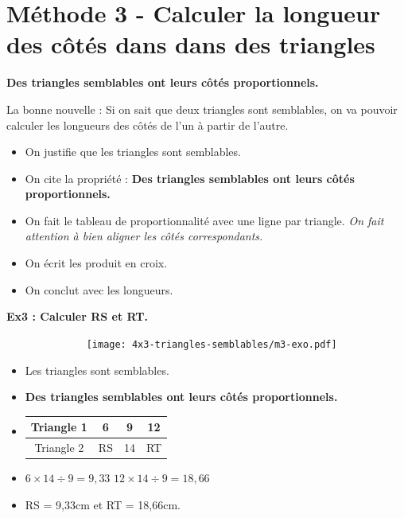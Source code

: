\newpage
\section*{Méthode 3 - Calculer la longueur des côtés dans dans des triangles}

\textbf{Des triangles semblables ont leurs côtés proportionnels.}

La bonne nouvelle : Si on sait que deux triangles sont semblables, on va pouvoir calculer les longueurs des côtés de l'un à partir de l'autre. 

\begin{itemize}
  \item On justifie que les triangles sont semblables.
  \item On cite la propriété : \textbf{Des triangles semblables ont leurs côtés proportionnels.} 
  \item On fait le tableau de proportionnalité avec une ligne par triangle. \textit{On fait attention à bien aligner les côtés correspondants.}
  \item On écrit les produit en croix. 
  \item On conclut avec les longueurs. 
\end{itemize}

\horrule{1px}
\textbf{Ex3 : Calculer RS et RT.}

\begin{multicols}{2}
\begin{figure}[H]
      \centering
      \texttt{[image: 4x3-triangles-semblables/m3-exo.pdf]}
\end{figure}
\columnbreak

\begin{itemize}
  \item Les triangles sont semblables.
  \item \textbf{Des triangles semblables ont leurs côtés proportionnels.} 
  \item     
  \begin{tabular}{|c|c|c|c|}
    \hline
    Triangle 1 & 6 & 9 & 12 \\  \hline
    Triangle 2 & RS & 14 & RT\\  \hline
  \end{tabular}
  \item $6  \times 14 \div 9 = 9,33$ \newline
        $12 \times 14 \div 9 = 18,66$
  \item RS = 9,33cm et RT = 18,66cm.
\end{itemize}

\end{multicols}

